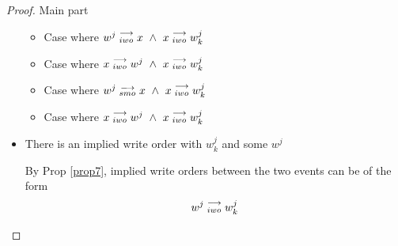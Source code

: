 \begin{proof}{Main part}
\begin{itemize}
                        \begin{itemize}
                            \item Case where $w^j\stackrel{\longrightarrow}{_{iwo}}x \ \wedge \ x\stackrel{\longrightarrow}{_{iwo}}w_k^j$
                            \item Case where $x\stackrel{\longrightarrow}{_{iwo}}w^j \ \wedge \ x\stackrel{\longrightarrow}{_{iwo}}w_k^j$
                            \item Case where $w^j\stackrel{\longrightarrow}{_{smo}}x \ \wedge \ x\stackrel{\longrightarrow}{_{iwo}}w_k^j$
                            \item Case where $x\stackrel{\longrightarrow}{_{iwo}}w^j \ \wedge \ x\stackrel{\longrightarrow}{_{iwo}}w_k^j$
                        \end{itemize}


                    \item There is an implied write order with $w_k^j$ and some $w^j$
                    
                        By Prop \ref{prop7}, implied write orders between the two events can be of the form 
                        \begin{align*}
                            w^j\stackrel{\longrightarrow}{_{iwo}}w_k^j 
                        \end{align*}
                        

\end{itemize}
\end{proof}
